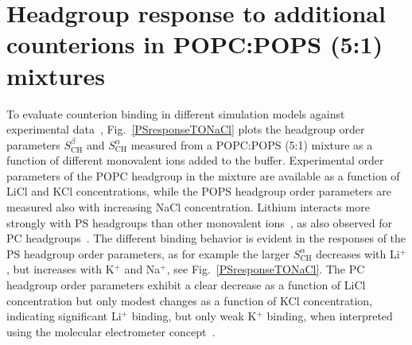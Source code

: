 \documentclass[journal=jpcbfk,manuscript=article]{achemso}
\begin{document}
\section{Headgroup response to additional counterions in POPC:POPS (5:1) mixtures}\label{mixtureTOadditionalCIs}
To evaluate counterion binding in different simulation models against experimental data~\cite{roux90},
Fig.~\ref{PSresponseTONaCl} plots the headgroup order parameters $S^\beta_\mathrm{CH}$ and $S^\alpha_\mathrm{CH}$ measured from a POPC:POPS (5:1) mixture
as a function of different monovalent ions added to the buffer. 
Experimental order parameters of the POPC headgroup in the mixture are available as a function
of LiCl and KCl concentrations, while the POPS headgroup order parameters are measured also
with increasing NaCl concentration. Lithium interacts more strongly with PS headgroups than other monovalent 
ions~\cite{hauser83,hauser85,roux86,mattai89,roux90}, as also observed for PC headgroups~\cite{cevc90}. 
The different binding behavior is evident in the responses of the PS headgroup order parameters, as for example
the larger $S^\alpha_\mathrm{CH}$
decreases with Li$^+$, but increases with K$^+$ and Na$^+$, see Fig.~\ref{PSresponseTONaCl}.
The PC headgroup order parameters exhibit a clear decrease as a function of LiCl concentration
but only modest changes as a function of KCl concentration, indicating significant 
Li$^+$ binding, but only weak K$^+$ binding, when interpreted using the
molecular electrometer concept~\cite{akutsu81,altenbach84,seelig87}.
\end{document}
